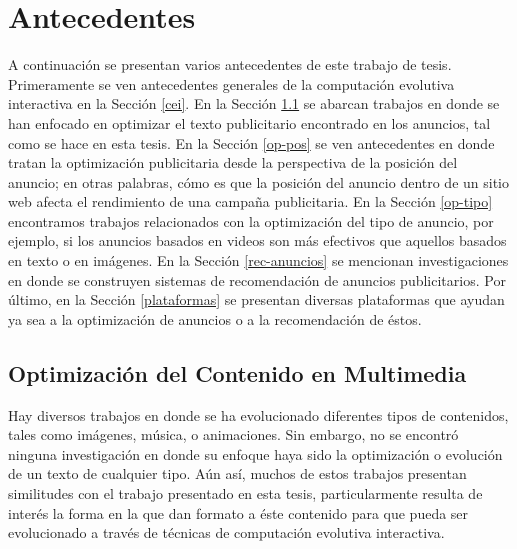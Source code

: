 
\chapter{Antecedentes}

A continuación se presentan varios antecedentes de este trabajo de tesis. Primeramente se ven antecedentes generales de la computación evolutiva interactiva en la Sección \ref{cei}. En la Sección \ref{op-texto} se abarcan trabajos en donde se han enfocado en optimizar el texto publicitario encontrado en los anuncios, tal como se hace en esta tesis. En la Sección \ref{op-pos} se ven antecedentes en donde tratan la optimización publicitaria desde la perspectiva de la posición del anuncio; en otras palabras, cómo es que la posición del anuncio dentro de un sitio web afecta el rendimiento de una campaña publicitaria. En la Sección \ref{op-tipo} encontramos trabajos relacionados con la optimización del tipo de anuncio, por ejemplo, si los anuncios basados en videos son más efectivos que aquellos basados en texto o en imágenes. En la Sección \ref{rec-anuncios} se mencionan investigaciones en donde se construyen sistemas de recomendación de anuncios publicitarios. Por último, en la Sección \ref{plataformas} se presentan diversas plataformas que ayudan ya sea a la optimización de anuncios o a la recomendación de éstos.

\clearpage
\section{Optimización del Contenido en Multimedia}
\label{op-texto}

Hay diversos trabajos en donde se ha evolucionado diferentes tipos de contenidos, tales como imágenes, música, o animaciones. Sin embargo, no se encontró ninguna investigación en donde su enfoque haya sido la optimización o evolución de un texto de cualquier tipo. Aún así, muchos de estos trabajos presentan similitudes con el trabajo presentado en esta tesis, particularmente resulta de interés la forma en la que dan formato a éste contenido para que pueda ser evolucionado a través de técnicas de computación evolutiva interactiva.

